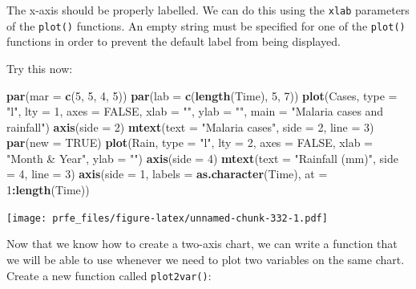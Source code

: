 \documentclass[12pt,a4paper]{book}
\newenvironment{Shaded}{\begin{snugshade}}{\end{snugshade}}
\newcommand{\KeywordTok}[1]{\textcolor[rgb]{0.13,0.29,0.53}{\textbf{#1}}}
\newcommand{\DataTypeTok}[1]{\textcolor[rgb]{0.13,0.29,0.53}{#1}}
\newcommand{\DecValTok}[1]{\textcolor[rgb]{0.00,0.00,0.81}{#1}}
\newcommand{\StringTok}[1]{\textcolor[rgb]{0.31,0.60,0.02}{#1}}
\newcommand{\OtherTok}[1]{\textcolor[rgb]{0.56,0.35,0.01}{#1}}
\newcommand{\OperatorTok}[1]{\textcolor[rgb]{0.81,0.36,0.00}{\textbf{#1}}}
\newcommand{\NormalTok}[1]{#1}
\theoremstyle{definition}
\theoremstyle{definition}
\theoremstyle{definition}
\theoremstyle{remark}
\begin{document}
The x-axis should be properly labelled. We can do this using the
\texttt{xlab} parameters of the \texttt{plot()} functions. An empty
string must be specified for one of the \texttt{plot()} functions in
order to prevent the default label from being displayed.

Try this now:

\begin{Shaded}
\begin{Highlighting}[]
\KeywordTok{par}\NormalTok{(}\DataTypeTok{mar =} \KeywordTok{c}\NormalTok{(}\DecValTok{5}\NormalTok{, }\DecValTok{5}\NormalTok{, }\DecValTok{4}\NormalTok{, }\DecValTok{5}\NormalTok{))}
\KeywordTok{par}\NormalTok{(}\DataTypeTok{lab =} \KeywordTok{c}\NormalTok{(}\KeywordTok{length}\NormalTok{(Time), }\DecValTok{5}\NormalTok{, }\DecValTok{7}\NormalTok{))}
\KeywordTok{plot}\NormalTok{(Cases, }\DataTypeTok{type =} \StringTok{"l"}\NormalTok{, }\DataTypeTok{lty =} \DecValTok{1}\NormalTok{, }\DataTypeTok{axes =} \OtherTok{FALSE}\NormalTok{,}
     \DataTypeTok{xlab =} \StringTok{""}\NormalTok{, }\DataTypeTok{ylab =} \StringTok{""}\NormalTok{, }\DataTypeTok{main =} \StringTok{"Malaria cases and rainfall"}\NormalTok{)}
\KeywordTok{axis}\NormalTok{(}\DataTypeTok{side =} \DecValTok{2}\NormalTok{)}
\KeywordTok{mtext}\NormalTok{(}\DataTypeTok{text =} \StringTok{"Malaria cases"}\NormalTok{, }\DataTypeTok{side =} \DecValTok{2}\NormalTok{, }\DataTypeTok{line =} \DecValTok{3}\NormalTok{)}
\KeywordTok{par}\NormalTok{(}\DataTypeTok{new =} \OtherTok{TRUE}\NormalTok{)}
\KeywordTok{plot}\NormalTok{(Rain, }\DataTypeTok{type =} \StringTok{"l"}\NormalTok{, }\DataTypeTok{lty =} \DecValTok{2}\NormalTok{, }\DataTypeTok{axes =} \OtherTok{FALSE}\NormalTok{,}
     \DataTypeTok{xlab =} \StringTok{"Month & Year"}\NormalTok{, }\DataTypeTok{ylab =} \StringTok{""}\NormalTok{)}
\KeywordTok{axis}\NormalTok{(}\DataTypeTok{side =} \DecValTok{4}\NormalTok{)}
\KeywordTok{mtext}\NormalTok{(}\DataTypeTok{text =} \StringTok{"Rainfall (mm)"}\NormalTok{, }\DataTypeTok{side =} \DecValTok{4}\NormalTok{, }\DataTypeTok{line =} \DecValTok{3}\NormalTok{)}
\KeywordTok{axis}\NormalTok{(}\DataTypeTok{side =} \DecValTok{1}\NormalTok{, }\DataTypeTok{labels =} \KeywordTok{as.character}\NormalTok{(Time), }\DataTypeTok{at =} \DecValTok{1}\OperatorTok{:}\KeywordTok{length}\NormalTok{(Time))}
\end{Highlighting}
\end{Shaded}

\texttt{[image: prfe\_files/figure-latex/unnamed-chunk-332-1.pdf]}

Now that we know how to create a two-axis chart, we can write a function
that we will be able to use whenever we need to plot two variables on
the same chart. Create a new function called \texttt{plot2var()}:
\end{document}
